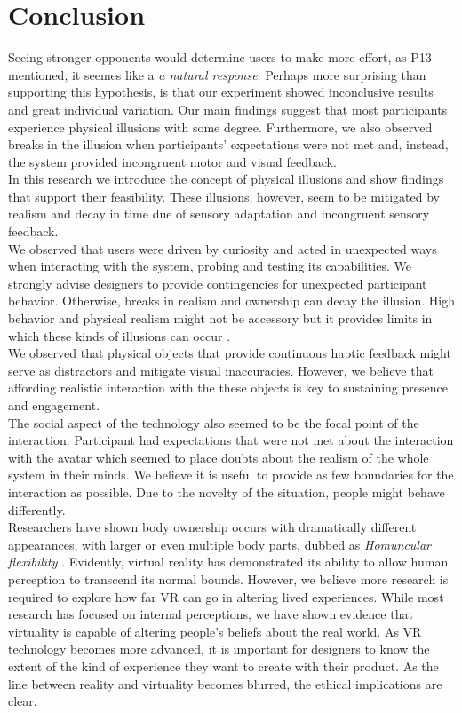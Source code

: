 \section{Conclusion}
Seeing stronger opponents would determine users to make more effort, as P13 mentioned, it seemes like a \textit{a natural response}. Perhaps more surprising than supporting this hypothesis, is that our experiment showed inconclusive results and great individual variation. Our main findings suggest that most participants experience physical illusions with some degree. Furthermore, we also observed breaks in the illusion when participants' expectations were not met and, instead, the system provided incongruent motor and visual feedback.
\\
In this research we introduce the concept of physical illusions and show findings that support their feasibility. These illusions, however, seem to be mitigated by realism and decay in time due of sensory adaptation and incongruent sensory feedback. 
\\
We observed that users were driven by curiosity and acted in unexpected ways when interacting with the system, probing and testing its capabilities. We strongly advise designers to provide contingencies for unexpected participant behavior. Otherwise, breaks in realism and ownership can decay the illusion. High behavior and physical realism might not be accessory but it provides limits in which these kinds of illusions can occur \cite{slater2009place}. \\
We observed that physical objects that provide continuous haptic feedback might serve as distractors and mitigate visual inaccuracies. However, we believe that affording realistic interaction with the these objects is key to sustaining presence and engagement.\\
The social aspect of the technology also seemed to be the focal point of the interaction. Participant had expectations that were not met about the interaction with the avatar which seemed to place doubts about the realism of the whole system in their minds. We believe it is useful to provide as few boundaries for the interaction as possible. Due to the novelty of the situation, people might behave differently. \\
Researchers have shown body ownership occurs with dramatically different appearances, with larger or even multiple body parts, dubbed as \textit{Homuncular flexibility} \cite{normand2011multisensory, won2015homuncular}. Evidently, virtual reality has demonstrated its ability to allow human perception to transcend its normal bounds. However, we believe more research is required to explore how far VR can go in altering lived experiences. While most research has focused on internal perceptions, we have shown evidence that virtuality is capable of altering people's beliefs about the real world. As VR technology becomes more advanced, it is important for designers to know the extent of the kind of experience they want to create with their product. As the line between reality and virtuality becomes blurred, the ethical implications are clear.


